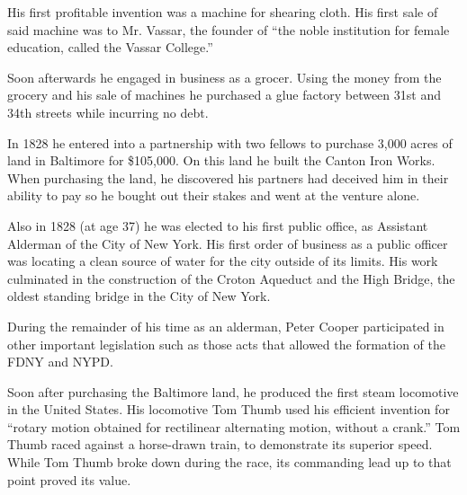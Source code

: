 \documentclass{article}
\begin{document}
\begin{minipage}[t]{0.46\linewidth}
\begin{enumList}
\item His first profitable invention was a machine for shearing cloth. His
first sale of said machine was to Mr. Vassar, the founder of ``the noble
institution for female education, called the Vassar College.''

\item Soon afterwards he engaged in business as a grocer. Using the money from
the grocery and his sale of machines he purchased a {\mdseries glue factory}
between 31st and 34th streets while {\mdseries incurring no debt}.

\setcounter{enumTemp}{\value{enumListi}}
\end{enumList}
\end{minipage}\hfill
\begin{minipage}[t]{0.46\linewidth}
\fontsize{10.7pt}{12.7pt}\selectfont
\raggedright
\upshape
\begin{enumList}
\setcounter{enumListi}{\value{enumTemp}}

\item In 1828 he entered into a partnership with two fellows to purchase 3,000
acres of land in Baltimore for \$105,000. On this land he built the {\mdseries
Canton Iron Works}. When purchasing the land, he discovered his partners had
deceived him in their ability to pay so he bought out their stakes and went at
the venture alone.

\item Also in 1828 (at age 37) he was elected to his first public office, as
{\mdseries Assistant Alderman} of the City of New York. His first order of
business as a public officer was locating a clean source of water for the city
outside of its limits. His work culminated in the construction of the
{\mdseries Croton Aqueduct} and the {\mdseries High Bridge}, the oldest
standing bridge in the City of New York.

\item During the remainder of his time as an alderman, Peter Cooper
participated in other important legislation such as those acts that {\mdseries
allowed the formation of the FDNY and NYPD}.

\item Soon after purchasing the Baltimore land, he produced the {\mdseries
first steam locomotive in the United States}. His locomotive Tom Thumb used
his efficient invention for ``rotary motion obtained for rectilinear
alternating motion, without a crank.'' Tom Thumb raced against a horse-drawn
train, to demonstrate its superior speed. While Tom Thumb broke down during
the race, its commanding lead up to that point proved its value.


\end{enumList}
\end{minipage}
\end{document}
